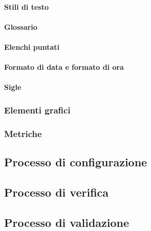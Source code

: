 \paragraph{Stili di testo}

\paragraph{Glossario}

\paragraph{Elenchi puntati}

\paragraph{Formato di data e formato di ora}

\paragraph{Sigle}


\subsubsection{Elementi grafici}


\subsubsection{Metriche}


\subsection{Processo di configurazione}

\subsection{Processo di verifica}

\subsection{Processo di validazione}